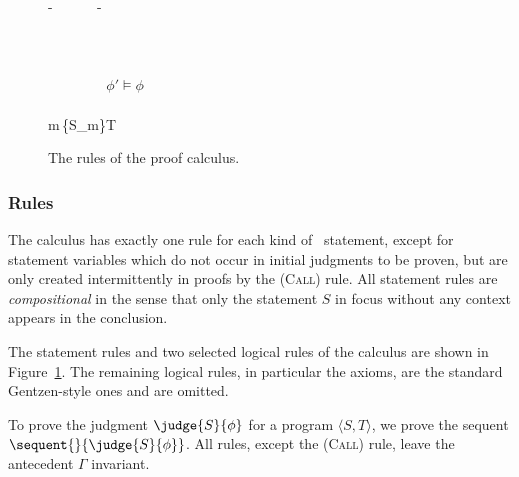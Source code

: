 \documentclass[a4paper,numberwithinsect]{lipics-v2021}
\newcommand{\bordertext}[1]{
\setlength{\fboxsep}{5pt}%
\setlength{\fboxrule}{0.5pt}%
\fbox{\parbox[c]{0.95\textwidth}{#1}}
}
\begin{document}
\begin{figure}%
\centering
{}
{-}
{}~~~~~
% 
\quad
{}
{-}
{} 
\\~\\


{ \quad
  }
{}
\quad
{}
{ \quad
  }
{}
\\~\\

{}
{} ~~~~~
\qquad
{}
{}
{}~~
$\phi' \models \phi$  
\\~\\

  {\not\in\Gamma\qquad m\,\{S_m\}\in T}
  {}
  {}
%
\caption{The rules of the proof calculus.}
\label{fig:calculus}
\end{figure}

\subsubsection{Rules}

The calculus has exactly one rule for each kind of \Rec\ statement,
except for statement variables which do not occur in initial judgments
to be proven, but are only created intermittently in proofs by the
(\textsc{Call}) rule. All statement rules are \emph{compositional} in
the sense that only the statement $S$ in focus without any context
appears in the conclusion.

The statement rules and two selected logical rules of the calculus are
shown in Figure~\ref{fig:calculus}. The remaining logical rules, in
particular the axioms, are the standard Gentzen-style ones and are
omitted.

To prove the judgment $\judge{S}{\phi}$ for a program
$\langle S,T\rangle$, we prove the sequent
$\sequent{}{\judge{S}{\phi}}$. All rules, except the (\textsc{Call})
rule, leave the antecedent $\Gamma$ invariant.
\end{document}
